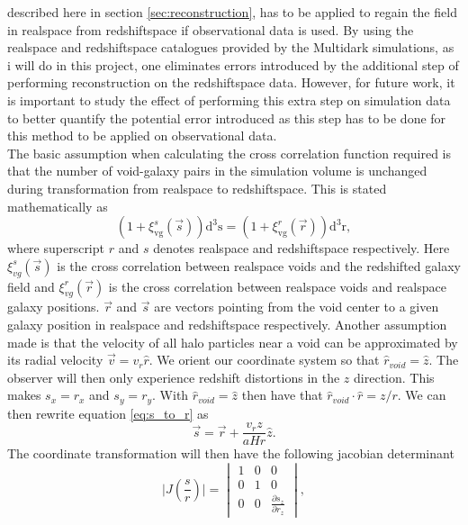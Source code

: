 described here in section \ref{sec:reconstruction}, has to be applied to regain
the field in realspace from redshiftspace if observational data is used. By using the realspace and redshiftspace catalogues provided by the Multidark simulations\cite{Multidark_dataset}, as i will do in this project, one eliminates errors introduced by the additional step of performing reconstruction on the redshiftspace data. However, for future work, it is important to study the effect of performing this extra step on simulation data to better quantify the potential error introduced as this step has to be done for this method to be applied on observational data.\\\indent
The basic assumption when calculating the cross correlation function
required is that the number of void-galaxy pairs in the simulation volume is
unchanged during transformation from realspace to redshiftspace. This is stated
mathematically as
\begin{equation}\label{eq:corr_void_start}
    (1 + \xi^s_{\mathrm{vg}}(\vec{s}))\mathrm{d}^3\mathrm{s}=(1 + \xi^r_{\mathrm{vg}}(\vec{r}))\mathrm{d}^3\mathrm{r},
\end{equation}
where superscript $r$ and $s$ denotes realspace and redshiftspace respectively.
Here $\xi^s_{vg}(\vec{s})$ is the cross correlation between realspace voids and
the redshifted galaxy field and $\xi^r_{vg}(\vec{r})$ is the cross correlation
between realspace voids and realspace galaxy positions. $\vec{r}$ and $\vec{s}$
are vectors pointing from the void center to a given galaxy position in
realspace and redshiftspace respectively. Another assumption made
is that the velocity of all halo particles near a void can be approximated by
its radial velocity $\vec{v}=v_r \hat{r}$. We orient our coordinate system so that
$\hat{r}_{void}=\hat{z}$. The observer will then only experience redshift
distortions in the $z$ direction. This makes $s_x=r_x$ and $s_y=r_y$. With $\hat{r}_{void}=\hat{z}$ then have that
$\hat{r}_{void}\cdot\hat{r}=z/r$. We can then rewrite equation \ref{eq:s_to_r}
as
\begin{equation}\label{eq:s_tp_r}
    \vec{s}=\vec{r}+\frac{v_rz}{aHr}\hat{z}.
\end{equation}
The coordinate transformation will then have the
following jacobian determinant
\begin{equation}
    \vert J(\frac{s}{r})\vert=
    \begin{vmatrix}
        1 & 0 & 0\\
        0 & 1 & 0\\
        0 & 0 & \frac{\partial s_z}{\partial r_z} 
    \end{vmatrix},
\end{equation}

